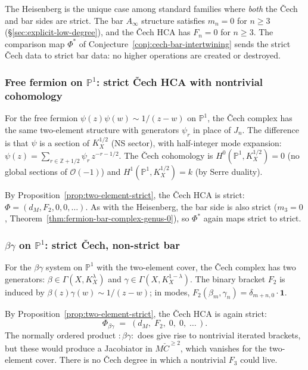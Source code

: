 \begin{remark}
\label{rem:cech-bar-strict-heisenberg}
The Heisenberg is the unique case among standard families where
\emph{both} the \v{C}ech and bar sides are strict. The bar
$A_\infty$ structure satisfies $m_n = 0$ for $n \geq 3$
(\S\ref{sec:explicit-low-degree}), and the \v{C}ech HCA has
$F_n = 0$ for $n \geq 3$. The comparison map $\Phi^*$ of
Conjecture~\ref{conj:cech-bar-intertwining} sends the strict
\v{C}ech data to strict bar data: no higher operations are created
or destroyed.
\end{remark}

\subsubsection{Free fermion on $\mathbb{P}^1$: strict \v{C}ech HCA
with nontrivial cohomology}
\label{subsec:cech-fermion-p1}

For the free fermion $\psi(z)\psi(w) \sim 1/(z-w)$ on
$\mathbb{P}^1$, the \v{C}ech complex has the same two-element
structure with generators $\psi_r$ in place of $J_n$. The
difference is that $\psi$ is a section of $K_X^{1/2}$ (NS sector),
with half-integer mode expansion:
$\psi(z) = \sum_{r \in \mathbb{Z}+1/2} \psi_r\,z^{-r-1/2}$.
The \v{C}ech cohomology is
$H^0(\mathbb{P}^1, K_X^{1/2}) = 0$ (no global sections of
$\mathcal{O}(-1)$) and $H^1(\mathbb{P}^1, K_X^{1/2}) = k$ (by
Serre duality).

By Proposition~\ref{prop:two-element-strict}, the \v{C}ech HCA is
strict: $\Phi = (d_M, F_2, 0, 0, \ldots)$. As with the
Heisenberg, the bar side is also strict ($m_3 = 0$,
Theorem~\ref{thm:fermion-bar-complex-genus-0}), so $\Phi^*$
again maps strict to strict.

\subsubsection{$\beta\gamma$ on $\mathbb{P}^1$: strict \v{C}ech,
non-strict bar}
\label{subsec:cech-betagamma-p1}

For the $\beta\gamma$ system on $\mathbb{P}^1$ with the two-element
cover, the \v{C}ech complex has two generators:
$\beta \in \Gamma(X, K_X^\lambda)$ and
$\gamma \in \Gamma(X, K_X^{1-\lambda})$. The binary bracket $F_2$ is
induced by $\beta(z)\gamma(w) \sim 1/(z-w)$; in modes,
$F_2(\beta_m, \gamma_n) = \delta_{m+n,0} \cdot \mathbf{1}$.

By Proposition~\ref{prop:two-element-strict}, the \v{C}ech HCA is
again strict:
\[
\Phi_{\beta\gamma}
 \;=\; (d_M,\; F_2,\; 0,\; 0,\; \ldots\,).
\]
The normally ordered product $:\!\beta\gamma\!:$ does give rise to
nontrivial iterated brackets, but these would produce a
Jacobiator in $M\check{C}^{\geq 2}$, which vanishes for the
two-element cover. There is no \v{C}ech degree in which
a nontrivial $F_3$ could live.

